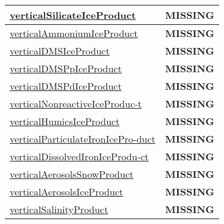 {\begin{center}
\begin{longtable}{| p{2.0in} | p{4.0in} |}
    \hyperref[subsec:var_sec_tracer_products_verticalSilicateIceProduct]{verticalSilicateIceProduct} & {\bf \color{red} MISSING} \\
    \hline
    \hyperref[subsec:var_sec_tracer_products_verticalAmmoniumIceProduct]{verticalAmmoniumIceProduct} & {\bf \color{red} MISSING} \\
    \hline
    \hyperref[subsec:var_sec_tracer_products_verticalDMSIceProduct]{verticalDMSIceProduct} & {\bf \color{red} MISSING} \\
    \hline
    \hyperref[subsec:var_sec_tracer_products_verticalDMSPpIceProduct]{verticalDMSPpIceProduct} & {\bf \color{red} MISSING} \\
    \hline
    \hyperref[subsec:var_sec_tracer_products_verticalDMSPdIceProduct]{verticalDMSPdIceProduct} & {\bf \color{red} MISSING} \\
    \hline
    \hyperref[subsec:var_sec_tracer_products_verticalNonreactiveIceProduct]{verticalNonreactiveIceProduc-}\hyperref[subsec:var_sec_tracer_products_verticalNonreactiveIceProduct]{t  }& {\bf \color{red} MISSING} \\
    \hline
    \hyperref[subsec:var_sec_tracer_products_verticalHumicsIceProduct]{verticalHumicsIceProduct} & {\bf \color{red} MISSING} \\
    \hline
    \hyperref[subsec:var_sec_tracer_products_verticalParticulateIronIceProduct]{verticalParticulateIronIcePro-}\hyperref[subsec:var_sec_tracer_products_verticalParticulateIronIceProduct]{duct  }& {\bf \color{red} MISSING} \\
    \hline
    \hyperref[subsec:var_sec_tracer_products_verticalDissolvedIronIceProduct]{verticalDissolvedIronIceProdu-}\hyperref[subsec:var_sec_tracer_products_verticalDissolvedIronIceProduct]{ct  }& {\bf \color{red} MISSING} \\
    \hline
    \hyperref[subsec:var_sec_tracer_products_verticalAerosolsSnowProduct]{verticalAerosolsSnowProduct} & {\bf \color{red} MISSING} \\
    \hline
    \hyperref[subsec:var_sec_tracer_products_verticalAerosolsIceProduct]{verticalAerosolsIceProduct} & {\bf \color{red} MISSING} \\
    \hline
    \hyperref[subsec:var_sec_tracer_products_verticalSalinityProduct]{verticalSalinityProduct} & {\bf \color{red} MISSING} \\
    \hline
\end{longtable}
\end{center}
}
